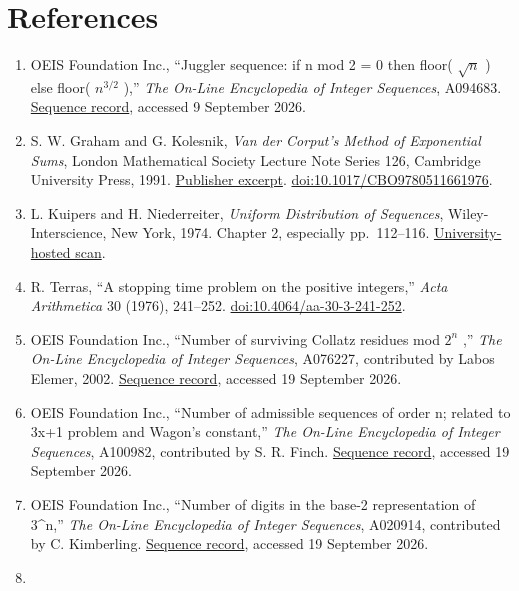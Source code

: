 \documentclass[11pt,a4paper]{article}
\providecommand{\tightlist}{\setlength{\itemsep}{0pt}\setlength{\parskip}{0pt}}
\begin{document}
\section{References}\label{references}

\begin{enumerate}
\def\labelenumi{\arabic{enumi}.}
\tightlist
\item
  OEIS Foundation Inc., ``Juggler sequence: if n mod 2 = 0 then floor(
  \(\sqrt{n}\) ) else floor( \(n^{3/2}\) ),'' \emph{The On-Line
  Encyclopedia of Integer Sequences}, A094683.
  \href{https://oeis.org/A094683}{Sequence record}, accessed 9 September
  2026.
\item
  S. W. Graham and G. Kolesnik, \emph{Van der Corput's Method of
  Exponential Sums}, London Mathematical Society Lecture Note Series
  126, Cambridge University Press, 1991.
  \href{https://beckassets.blob.core.windows.net/product/readingsample/666252/9780521339278_excerpt_001.pdf}{Publisher
  excerpt}.
  \href{https://doi.org/10.1017/CBO9780511661976}{doi:10.1017/CBO9780511661976}.
\item
  L. Kuipers and H. Niederreiter, \emph{Uniform Distribution of
  Sequences}, Wiley-Interscience, New York, 1974. Chapter 2, especially
  pp.~112--116.
  \href{https://web.maths.unsw.edu.au/~josefdick/preprints/KuipersNied_book.pdf}{University-hosted
  scan}.
\item
  R. Terras, ``A stopping time problem on the positive integers,''
  \emph{Acta Arithmetica} 30 (1976), 241--252.
  \href{https://doi.org/10.4064/aa-30-3-241-252}{doi:10.4064/aa-30-3-241-252}.
\item
  OEIS Foundation Inc., ``Number of surviving Collatz residues mod
  \(2^n\) ,'' \emph{The On-Line Encyclopedia of Integer Sequences},
  A076227, contributed by Labos Elemer, 2002.
  \href{https://oeis.org/A076227}{Sequence record}, accessed 19
  September 2026.
\item
  OEIS Foundation Inc., ``Number of admissible sequences of order n;
  related to 3x+1 problem and Wagon's constant,'' \emph{The On-Line
  Encyclopedia of Integer Sequences}, A100982, contributed by S. R.
  Finch. \href{https://oeis.org/A100982}{Sequence record}, accessed 19
  September 2026.
\item
  OEIS Foundation Inc., ``Number of digits in the base-2 representation
  of 3\^{}n,'' \emph{The On-Line Encyclopedia of Integer Sequences},
  A020914, contributed by C. Kimberling.
  \href{https://oeis.org/A020914}{Sequence record}, accessed 19
  September 2026.
\item

\end{enumerate}
\end{document}
